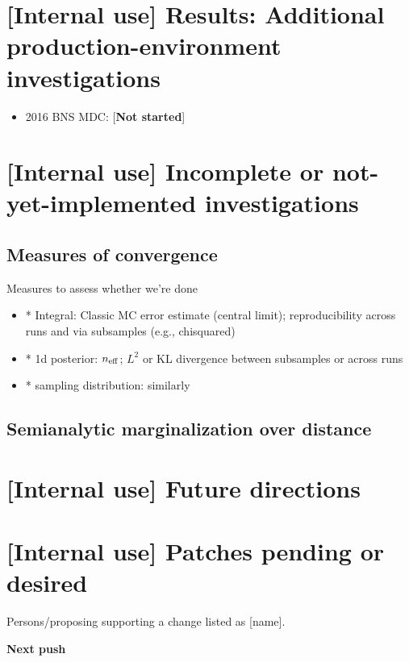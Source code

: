 \documentclass[twocolumn,prd,nofootinbib]{revtex4}
\begin{document}
{\section{[Internal use] Results: Additional production-environment investigations}

\begin{itemize}
\item 2016 BNS MDC: [\textbf{Not started}]

\end{itemize}

\section{[Internal use] Incomplete or not-yet-implemented investigations}

\subsection{Measures of convergence}

Measures to assess whether we're done
\begin{itemize}
\item * Integral: Classic MC error estimate (central limit); reproducibility across runs and via subsamples (e.g., chisquared)

\item * 1d posterior:  $n_{\rm eff}$; $L^2$ or KL divergence between subsamples or across runs

\item * sampling distribution: similarly
\end{itemize}


\subsection{Semianalytic marginalization over distance}


\section{[Internal use] Future directions}

\section{[Internal use] Patches pending or desired}

Persons/proposing supporting  a change listed as [name].

\noindent \textbf{Next push}

}
\end{document}
